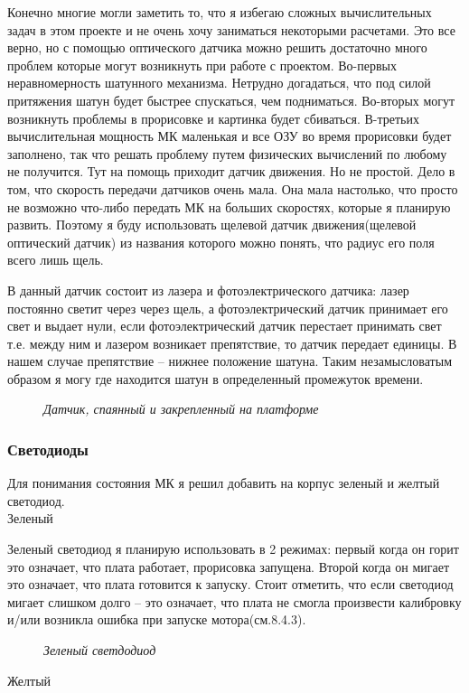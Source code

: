 \documentclass[a4paper, 12pt]{article}
\newcommand{\image}[3]{
	\begin{figure}[ht]
		\center{\texttt{[image: img/\#1]} }
		\caption{\textit{#3}}\end{figure}
}
\begin{document}
Конечно многие могли заметить то, что я избегаю сложных вычислительных
задач в этом проекте и не очень хочу заниматься некоторыми расчетами. Это все
верно, но с помощью оптического датчика можно решить достаточно много проблем
которые могут возникнуть при работе с проектом. Во-первых неравномерность
шатунного механизма. Нетрудно догадаться, что под силой притяжения шатун будет
быстрее спускаться, чем подниматься. Во-вторых могут возникнуть проблемы
в прорисовке и картинка будет сбиваться. В-третьих вычислительная мощность МК
маленькая и все ОЗУ во время прорисовки будет заполнено, так что решать
проблему путем физических вычислений по любому не получится. Тут на помощь
приходит датчик движения. Но не простой. Дело в том, что скорость передачи
датчиков очень мала. Она мала настолько, что просто не возможно что-либо
передать МК на больших скоростях, которые я планирую развить. Поэтому я буду
использовать щелевой датчик движения(щелевой оптический датчик) из названия
которого можно понять, что радиус его поля всего лишь щель.

В данный датчик состоит из лазера и фотоэлектрического датчика: лазер постоянно
светит через через щель, а фотоэлектрический датчик принимает его свет и
выдает нули, если фотоэлектрический датчик перестает принимать свет т.е. между
ним и лазером возникает препятствие, то датчик передает единицы. В нашем случае
препятствие -- нижнее положение шатуна. Таким незамысловатым образом я могу
где находится шатун в определенный промежуток времени.

\image{Датчик.jpg}{130}{Датчик, спаянный и закрепленный на платформе}

\newpage
\subsubsection{Светодиоды}

Для понимания состояния МК я решил добавить на корпус зеленый и желтый
светодиод.\\
\textbf{$\text{Зеленый}$}

Зеленый светодиод я планирую использовать в 2 режимах: первый когда он
горит это означает, что плата работает, прорисовка запущена. Второй когда он
мигает это означает, что плата готовится к запуску. Стоит отметить, что если
светодиод мигает слишком долго -- это означает, что плата не смогла произвести
калибровку и/или возникла ошибка при запуске мотора(см.8.4.3).

\image{Зеленый.jpg}{150}{Зеленый светдодиод}
\textbf{$\text{Желтый}$}
\end{document}

